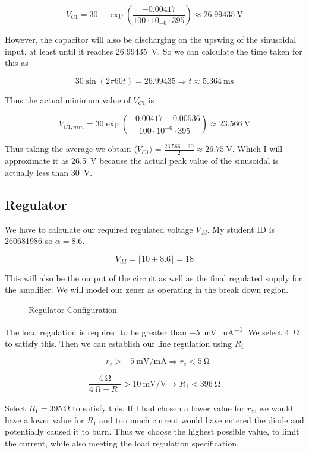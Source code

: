 \documentclass[journal]{IEEEtran}
\begin{document}
$$ V_{C1} = 30 - \exp \left( \frac{-0.00417}{100 \cdot 10_{-6} \cdot 395} \right) \approx \SI{26.99435}{\volt} $$

However, the capacitor will also be discharging on the upswing of the sinusoidal input, at least until it reaches \SI{26.99435}{\volt}. So we can calculate the time taken for this as

$$ 30 \sin\left( 2 \pi 60 t \right) = 26.99435 \Longrightarrow t \approx \SI{5.364}{\milli\second} $$

Thus the actual minimum value of $V_{C1}$ is

$$ V_{C1,min} = 30 \exp\left( \frac{-0.00417 - 0.00536}{100 \cdot 10^{-6} \cdot 395} \right) \approx \SI{23.566}{\volt}$$

Thus taking the average we obtain $ \langle V_{C1} \rangle = \frac{23.566 + 30}{2} \approx \SI{26.75}{\volt}$. Which I will approximate it as \SI{26.5}{\volt} because the actual peak value of the sinusoidal is actually less than \SI{30}{\volt}.

\subsection{Regulator}
We have to calculate our required regulated voltage $V_{dd}$. My student ID is 260681986 so $\alpha = 8.6$.

$$V_{dd} = \lfloor 10 + 8.6 \rfloor = 18$$

This will also be the output of the circuit as well as the final regulated supply for the amplifier. We will model our zener as operating in the break down region.

\begin{figure}[h]
	\centering
	
	\caption{Regulator Configuration}
	\label{regconfig}
\end{figure}

The load regulation is required to be greater than \SI{-5}{\milli\volt\per\milli\ampere}. We select \SI{4}{\ohm} to satisfy this. Then we can establish our line regulation using $R_1$

$$ -r_z > \SI{-5}{\milli\volt\per\milli\ampere} \Longrightarrow r_z < \SI{5}{\ohm} $$

$$ \frac{\SI{4}{\ohm}}{\SI{4}{\ohm} + R_1} > \SI[per-mode=symbol]{10}{\milli\volt\per\volt} \Longrightarrow R_1 < \SI{396}{\ohm} $$

Select $R_1 = \SI{395}{\ohm}$ to satisfy this. If I had chosen a lower value for $r_z$, we would have a lower value for $R_1$ and too much current would have entered the diode and potentially caused it to burn. Thus we choose the highest possible value, to limit the current, while also meeting the load regulation specification.
\end{document}
